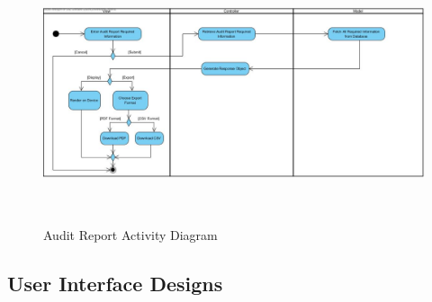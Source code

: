 \documentclass[12pt]{article}
\begin{document}
						\FloatBarrier
						\begin{figure}[h]
										\centering
										\includegraphics[width=6in, height=3in]{Pictures/AuditReportActivityDiagram.jpg}
										\caption{Audit Report Activity Diagram}
						\end{figure}
				\vspace{0.2in}
		\newpage
		\subsection{User Interface Designs} %
						
\end{document}
